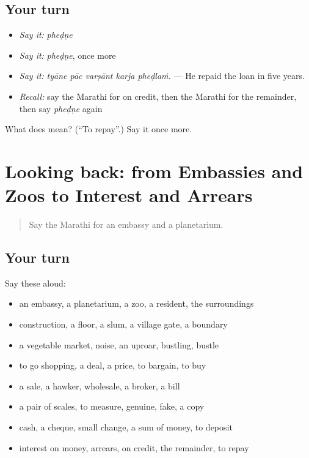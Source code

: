 \subsection*{Your turn}
\begin{itemize}
\raggedright
  \item \emph{Say it:} \emph{pheḍṇe}
  \item \emph{Say it:} \emph{pheḍṇe}, once more
  \item \emph{Say it:} \emph{tyāne pāc varṣānt karja pheḍlaṁ.} — He repaid the loan in five years.
  \item \emph{Recall:} say the Marathi for on credit, then the Marathi for the remainder, then say \emph{pheḍṇe} again
\end{itemize}

\begin{tcolorbox}[breakable,colback=teal!4,colframe=teal!35!black,title={Before you move on}]
What does  mean? (\textquotedblleft{}To repay\textquotedblright{}.) Say it once more.
\end{tcolorbox}
\section[(dialogue)]{Looking back: from Embassies and Zoos to Interest and Arrears}

\label{lesson:MR-R427-review-420-427}



\begin{quote}
Say the Marathi for an embassy and a planetarium.
\end{quote}

\subsection*{Your turn}
Say these aloud:

\begin{itemize}
\raggedright
  \item an embassy, a planetarium, a zoo, a resident, the surroundings
  \item construction, a floor, a slum, a village gate, a boundary
  \item a vegetable market, noise, an uproar, bustling, bustle
  \item to go shopping, a deal, a price, to bargain, to buy
  \item a sale, a hawker, wholesale, a broker, a bill
  \item a pair of scales, to measure, genuine, fake, a copy
  \item cash, a cheque, small change, a sum of money, to deposit
  \item interest on money, arrears, on credit, the remainder, to repay
\end{itemize}

